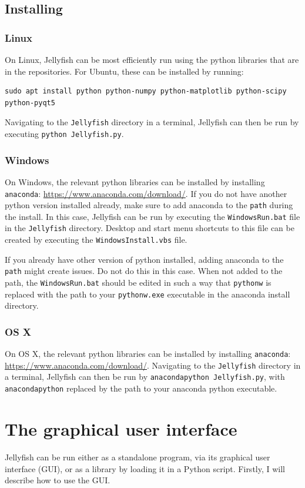 \documentclass[11pt,a4paper]{article}
\begin{document}
\subsection{Installing}
\subsubsection{Linux}
On Linux, Jellyfish can be most efficiently run using the python libraries that are in the
repositories. For Ubuntu, these can be installed by running:
\begin{verbatim}
sudo apt install python python-numpy python-matplotlib python-scipy
python-pyqt5
\end{verbatim}
Navigating to the \texttt{Jellyfish} directory in a terminal, Jellyfish can then be run
by executing \texttt{python Jellyfish.py}.

\subsubsection{Windows}
On Windows, the relevant python libraries can be installed by installing \texttt{anaconda}:
\url{https://www.anaconda.com/download/}. If you do not have another python version installed
already, make sure to add anaconda to the \texttt{path} during the install. In this case, Jellyfish
can be run by executing the \texttt{WindowsRun.bat} file in the \texttt{Jellyfish} directory.
Desktop and start menu shortcuts to this file can be created by executing the
\texttt{WindowsInstall.vbs} file.

If you already have other version of python installed, adding anaconda to the \texttt{path} might
create issues. Do not do this in this case. When not added to the path, the \texttt{WindowsRun.bat}
should be edited in such a way that \texttt{pythonw} is replaced with the path to your
\texttt{pythonw.exe} executable in the anaconda install directory. 

\subsubsection{OS X}
On OS X, the relevant python libraries can be installed by installing \texttt{anaconda}:
\url{https://www.anaconda.com/download/}. Navigating to the \texttt{Jellyfish} directory in a
terminal, Jellyfish can then be run by \texttt{anacondapython Jellyfish.py}, with \texttt{anacondapython}
replaced by the path to your anaconda python executable.

\section{The graphical user interface}
Jellyfish can be run either as a standalone program, via its graphical user interface (GUI), or as a
library by loading it in a Python script. Firstly, I will describe how to use the GUI.
\end{document}
